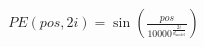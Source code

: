 \documentclass[preview]{standalone}
\begin{document}
\begin{align*}
PE(pos, 2i) = \sin\left( \frac{pos}{10000^{\frac{2i}{d_{\text{model}}}}} \right)
\end{align*}
\end{document}
